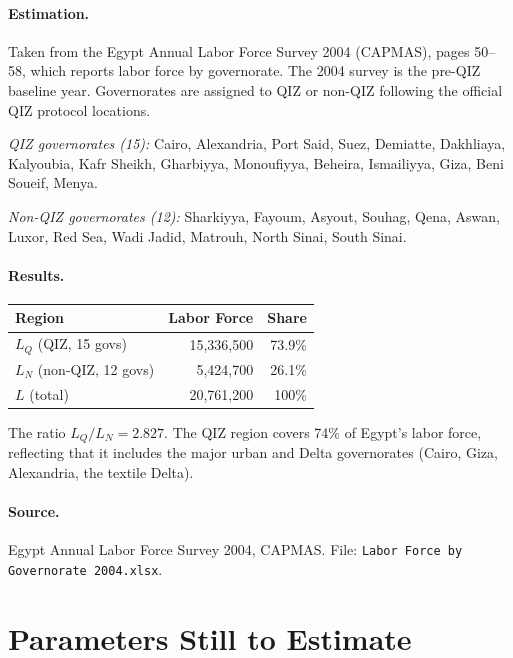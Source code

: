 \documentclass[12pt]{article}
\begin{document}
\paragraph{Estimation.}
Taken from the Egypt Annual Labor Force Survey 2004 (CAPMAS), pages 50--58,
which reports labor force by governorate. The 2004 survey is the
pre-QIZ baseline year. Governorates are assigned to QIZ or non-QIZ
following the official QIZ protocol locations.

\medskip
\noindent\textit{QIZ governorates (15):}
Cairo, Alexandria, Port Said, Suez, Demiatte, Dakhliaya, Kalyoubia,
Kafr Sheikh, Gharbiyya, Monoufiyya, Beheira, Ismailiyya, Giza,
Beni Soueif, Menya.

\noindent\textit{Non-QIZ governorates (12):}
Sharkiyya, Fayoum, Asyout, Souhag, Qena, Aswan, Luxor, Red Sea,
Wadi Jadid, Matrouh, North Sinai, South Sinai.

\paragraph{Results.}
\begin{center}
\begin{tabular}{lrr}
\toprule
Region & Labor Force & Share \\
\midrule
$L_Q$ (QIZ, 15 govs)     & 15,336,500 & 73.9\% \\
$L_N$ (non-QIZ, 12 govs) &  5,424,700 & 26.1\% \\
$L$ (total)               & 20,761,200 & 100\% \\
\bottomrule
\end{tabular}
\end{center}

\noindent The ratio $L_Q/L_N = 2.827$. The QIZ region covers 74\% of Egypt's
labor force, reflecting that it includes the major urban and Delta
governorates (Cairo, Giza, Alexandria, the textile Delta).

\paragraph{Source.}
Egypt Annual Labor Force Survey 2004, CAPMAS.
File: \texttt{Labor Force by Governorate 2004.xlsx}.

\section{Parameters Still to Estimate}
\end{document}
